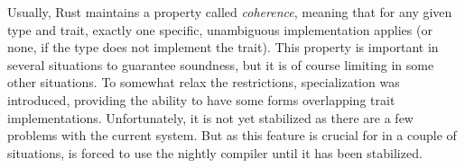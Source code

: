 Usually, Rust maintains a property called \emph{coherence}, meaning that for any given type and trait, exactly one specific, unambiguous implementation applies (or none, if the type does not implement the trait).
This property is important in several situations to guarantee soundness, but it is of course limiting in some other situations.
To somewhat relax the restrictions, specialization was introduced, providing the ability to have some forms overlapping trait implementations.
Unfortunately, it is not yet stabilized as there are a few problems with the current system.
But as this feature is crucial for  in a couple of situations,  is forced to use the nightly compiler until it has been stabilized.



